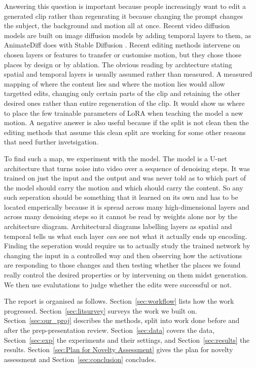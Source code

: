 \documentclass[twoside,english]{article}
\begin{document}
Answering this question is important because people increasingly want to edit a generated clip rather than regenrating it because changing the prompt changes the subject, the background and motion all at once. 
Recent video diffusion models are built on image diffusion models by adding temporal layers to them, as AnimateDiff
\citep{guo2024animatediff} does with Stable Diffusion \citep{rombach2022ldm}. Recent editing
methods \citep{wu2023tav,zhao2024motiondirector,ling2025motionclone,xiao2024moft} intervene on
chosen layers or features to transfer or customise motion, but they chose those places by design or by ablation. The obvious reading by archtecture stating spatial and temporal layers 
is usually assumed rather than measured. A measured mapping of where the content lies and where the motion lies would allow targetted edits, changing only certain parts of the clip and retaining the other 
desired ones rather than entire regeneration of the clip. It would show us where to place the few trainable parameters of LoRA \citep{hu2022lora} when teaching the model a new motion. 
A negative answer is also useful because if the split is not clean then the editing methods that assume this clean split are working for some other reasons that need further invetsigation. 


To find such a map, we experiment with the model. The model is a U-net architecture that turns noise into video over a sequence of denoising steps. It was trained on just the input and the output and was never told 
as to which part of the model should carry the motion and which should carry the content. So any
such seperation should be something that it learned on its own and has to be located emperically because
it is spread across many high-dimensional layers and across many denoising steps so it cannot be read
by weights alone nor by the architecture diagram. 
Architectural diagrams labelling layers as spatial and temporal tells us what each layer \emph{can}
see not what it actually ends up encoding. 
Finding the seperation would require us to actually study the trained network by changing the input
in a controlled way and then observing how the activations are responding to those changes and then
testing whether the places we found really control the desired properties or by intervening on them
midst generation. We then use evalutations to judge whether the edits were successful or not.


The report is organised as follows. Section~\ref{sec:workflow} lists how the work progressed.
Section~\ref{sec:litsurvey} surveys the work we built on. Section~\ref{sec:our_proj} describes
the methods, split into work done before and after the prep-presentation review.
Section~\ref{sec:data} covers the data, Section~\ref{sec:exp} the experiments and their
settings, and Section~\ref{sec:results} the results. Section~\ref{sec:Plan for Novelty Assessment}
gives the plan for novelty assessment and Section~\ref{sec:conclusion} concludes.
\end{document}
